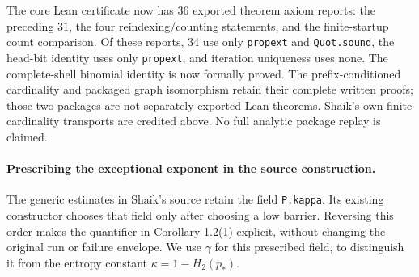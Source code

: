 \documentclass[11pt]{article}
\theoremstyle{remark}\newtheorem{remark}[proposition]{Remark}
\begin{document}
The core Lean certificate now has \(36\) exported theorem axiom reports:
the preceding \(31\), the four reindexing/counting statements, and the
finite-startup count comparison. Of these reports, \(34\) use only
\texttt{propext} and \texttt{Quot.sound}, the head-bit identity uses
only \texttt{propext}, and iteration uniqueness uses none.
The complete-shell binomial identity is now formally proved.
The prefix-conditioned cardinality and packaged graph isomorphism retain
their complete written proofs; those two packages are not separately
exported Lean theorems. Shaik's own finite cardinality transports are
credited above. No full analytic package replay is claimed.

\paragraph{Prescribing the exceptional exponent in the source construction.}
The generic estimates in Shaik's source retain the field
\texttt{P.kappa}. Its existing constructor chooses that field only after
choosing a low barrier. Reversing this order makes the quantifier in
Corollary 1.2(1) explicit, without changing the original run or failure
envelope. We use \(\gamma\) for this prescribed field, to distinguish it
from the entropy constant \(\kappa=1-H_2(p_*)\).
\end{document}
